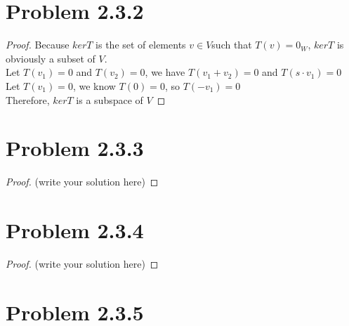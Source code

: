 \documentclass[12pt]{article}
\begin{document}
\newpage 

\section{Problem 2.3.2}

\begin{proof}
	Because $kerT$ is the set of elements $v\in V$such that $T(v)=0_W$, $kerT$ is obviously a subset of $V$. 
 \\ Let $T(v_1)=0$ and $T(v_2)=0$, we have $T(v_1 + v_2)=0$ and $T(s \cdot v_1)=0$
 \\Let $T(v_1)=0$, we know $T(0)=0$, so $T(-v_1)=0$
 \\Therefore, $kerT$ is a subspace of $V$
\end{proof}

\newpage 

\section{Problem 2.3.3}

\begin{proof}
	(write your solution here)
\end{proof}

\newpage 

\section{Problem 2.3.4}

\begin{proof}
	(write your solution here)
\end{proof}

\newpage 

\section{Problem 2.3.5}
\end{document}
